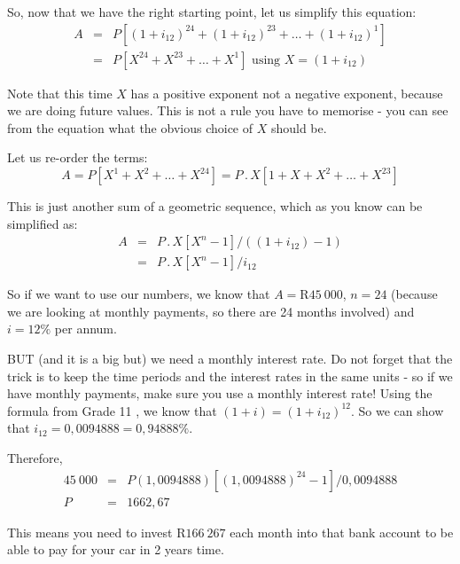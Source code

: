 So, now that we have the right starting point, let us simplify this equation:
\begin{eqnarray*}
A &=& P[(1+i_{12})^{24} + (1+i_{12})^{23} + \ldots + (1+i_{12})^{1}]\\
&=& P [ X^{24} + X^{23} + \ldots + X^1] \mbox{ using $X=(1+i_{12})$}
\end{eqnarray*}

Note that this time $X$ has a positive exponent not a negative exponent, because we are doing future values. This is not a rule you have to memorise - you can see from the equation what the obvious choice of $X$ should be.

Let us re-order the terms:
\begin{equation*}
A = P [ X^1 + X^2 + \ldots + X^{24}] = P \,.\, X [1 + X + X^2 + \ldots + X^{23}]
\end{equation*}

This is just another sum of a geometric sequence, which as you know can be simplified as:
\begin{eqnarray*}
A &=& P \,.\, X [X^n - 1] / ((1+i_{12})-1)\\
&=& P \,.\, X [X^n - 1] / i_{12}
\end{eqnarray*}

So if we want to use our numbers, we know that $A = $R$45~000$, $n=24$ (because we are looking at monthly payments, so there are 24 months involved) and $i = 12\%$ per annum.

BUT (and it is a big but) we need a monthly interest rate. Do not forget that the trick is to keep the time periods and the interest rates in the same units - so if we have monthly payments, make sure you use a monthly interest rate! Using the formula from Grade 11%
, we know that $(1+i) = (1+i_{12})^{12}$. So we can show that $i_{12} = 0,0094888 = 0,94888 \%$. 

Therefore,
\begin{eqnarray*}
45~000 &=& P (1,0094888) [(1,0094888)^{24} - 1] / 0,0094888\\
P&=&1 662,67
\end{eqnarray*}

This means you need to invest R$166~267$ each month into that bank account to be able to pay for your car in 2 years time.


